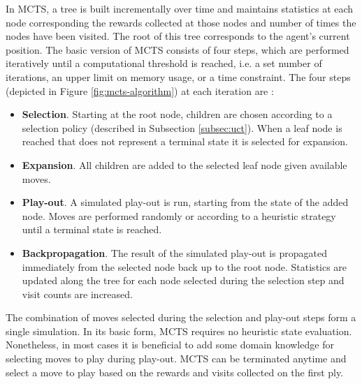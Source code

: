 \documentclass{ecai2010}
\begin{document}
In MCTS, a tree is built incrementally over time and maintains statistics at each node corresponding the rewards collected at those nodes and number of times the nodes have been visited. The root of this tree corresponds to the agent's current position. The basic version of MCTS consists of four steps, which are performed iteratively until a computational threshold is reached, i.e. a set number of iterations, an upper limit on memory usage, or a time constraint. The four steps (depicted in Figure \ref{fig:mcts-algorithm}) at each iteration are \cite{chaslot2008progressive}:
\begin{itemize}
\item {\bf Selection}. Starting at the root node, children are chosen according to a selection policy (described in Subsection \ref{subsec:uct}). When a leaf node is reached that does not represent a terminal state it is selected for expansion.
\item {\bf Expansion}. All children are added to the selected leaf node given available moves.
\item {\bf Play-out}. A simulated play-out is run, starting from the state of the added node. Moves are performed randomly or according to a heuristic strategy until a terminal state is reached.
\item {\bf Backpropagation}. The result of the simulated play-out is propagated immediately from the selected node back up to the root node. Statistics are updated along the tree for each node selected during the selection step and visit counts are increased.
\end{itemize}
The combination of moves selected during the selection and play-out steps form a single simulation. In its basic form, MCTS requires no heuristic state evaluation. Nonetheless, in most cases it is beneficial to add some domain knowledge for selecting moves to play during play-out. MCTS can be terminated anytime and select a move to play based on the rewards and visits collected on the first ply.

\end{document}
